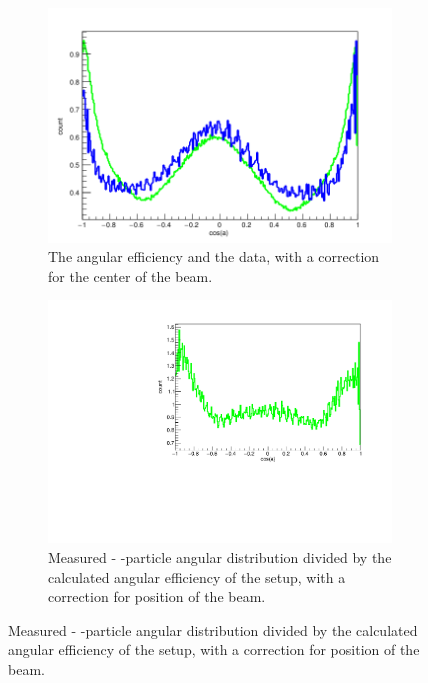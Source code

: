 \begin{figure}[h]
	\begin{subfigure}[]{.5\linewidth}
		\centering
		\includegraphics[width=\linewidth]{../figures/centerCorrections/try-3-30.png}
		\caption{The angular efficiency and the data, with a correction for the center of the beam. }
		\label{fig:centerCorrection}
	\end{subfigure}
	\begin{subfigure}[]{.5\linewidth}
		\centering
		\includegraphics[width=\linewidth]{../figures/betaAngles/dataDivEffCenterCorrected.pdf}
		\caption{Measured \be- \al-particle angular distribution divided by the calculated angular efficiency of the setup, with a correction for position of the beam. }
		\label{fig:dataDivEffCenter}
	\end{subfigure}
\end{figure}


